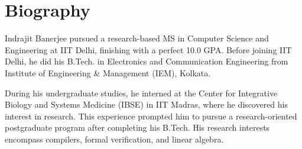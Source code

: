 \chapter*{Biography}
Indrajit Banerjee pursued a research-based MS in Computer Science and Engineering at IIT Delhi,
finishing with a perfect 10.0 GPA.
Before joining IIT Delhi, he did his B.Tech. in Electronics and Communication Engineering from
Institute of Engineering \& Management (IEM), Kolkata.

During his undergraduate studies, he interned at the Center for Integrative Biology and Systems Medicine (IBSE) in IIT Madras,
where he discovered his interest in research.
This experience prompted him to pursue a research-oriented postgraduate program after completing his B.Tech.
His research interests encompass compilers, formal verification, and linear algebra.
